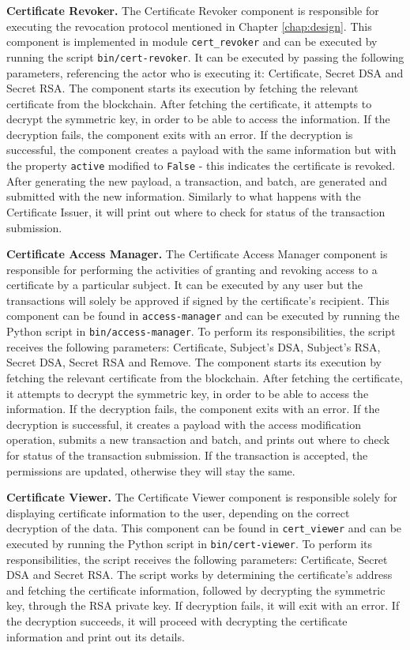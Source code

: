 \textbf{Certificate Revoker.} The Certificate Revoker component is responsible for executing the revocation protocol mentioned in Chapter \ref{chap:design}. This component is implemented in module \texttt{cert\_revoker} and can be executed by running the script \texttt{bin/cert-revoker}. It can be executed by passing the following parameters, referencing the actor who is executing it: Certificate, Secret DSA and Secret RSA. The component starts its execution by fetching the relevant certificate from the blockchain. After fetching the certificate, it attempts to decrypt the symmetric key, in order to be able to access the information. If the decryption fails, the component exits with an error. If the decryption is successful, the component creates a payload with the same information but with the property \texttt{active} modified to \texttt{False} - this indicates the certificate is revoked. After generating the new payload, a transaction, and batch, are generated and submitted with the new information. Similarly to what happens with the Certificate Issuer, it will print out where to check for status of the transaction submission.

\textbf{Certificate Access Manager.} The Certificate Access Manager component is responsible for performing the activities of granting and revoking access to a certificate by a particular subject. It can be executed by any user but the transactions will solely be approved if signed by the certificate's recipient. This component can be found in \texttt{access-manager} and can be executed by running the Python script in \texttt{bin/access-manager}. To perform its responsibilities, the script receives the following parameters: Certificate, Subject's DSA, Subject's RSA, Secret DSA, Secret RSA and Remove. The component starts its execution by fetching the relevant certificate from the blockchain. After fetching the certificate, it attempts to decrypt the symmetric key, in order to be able to access the information. If the decryption fails, the component exits with an error. If the decryption is successful, it creates a payload with the access modification operation, submits a new transaction and batch, and prints out where to check for status of the transaction submission. If the transaction is accepted, the permissions are updated, otherwise they will stay the same.

\textbf{Certificate Viewer.} The Certificate Viewer component is responsible solely for displaying certificate information to the user, depending on the correct decryption of the data.  This component can be found in \texttt{cert\_viewer} and can be executed by running the Python script in \texttt{bin/cert-viewer}. To perform its responsibilities, the script receives the following parameters: Certificate, Secret DSA and Secret RSA. The script works by determining the certificate's address and fetching the certificate information, followed by decrypting the symmetric key, through the RSA private key. If decryption fails, it will exit with an error. If the decryption succeeds, it will proceed with decrypting the certificate information and print out its details.

